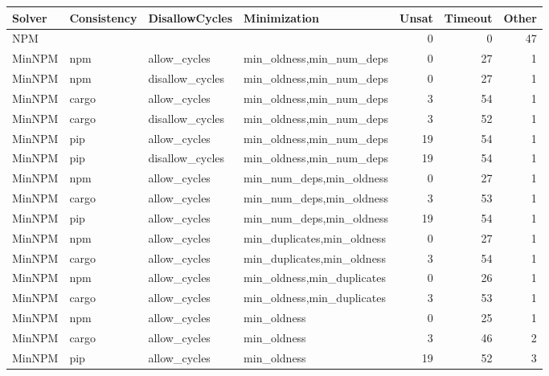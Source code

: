 \begin{table}[ht]
\centering
\begin{tabular}{llllrrr}
  \hline
Solver & Consistency & DisallowCycles & Minimization & Unsat & Timeout & Other \\ 
  \hline
NPM &  &  &  &   0 &   0 &  47 \\ 
  MinNPM & npm & allow\_cycles & min\_oldness,min\_num\_deps &   0 &  27 &   1 \\ 
  MinNPM & npm & disallow\_cycles & min\_oldness,min\_num\_deps &   0 &  27 &   1 \\ 
  MinNPM & cargo & allow\_cycles & min\_oldness,min\_num\_deps &   3 &  54 &   1 \\ 
  MinNPM & cargo & disallow\_cycles & min\_oldness,min\_num\_deps &   3 &  52 &   1 \\ 
  MinNPM & pip & allow\_cycles & min\_oldness,min\_num\_deps &  19 &  54 &   1 \\ 
  MinNPM & pip & disallow\_cycles & min\_oldness,min\_num\_deps &  19 &  54 &   1 \\ 
  MinNPM & npm & allow\_cycles & min\_num\_deps,min\_oldness &   0 &  27 &   1 \\ 
  MinNPM & cargo & allow\_cycles & min\_num\_deps,min\_oldness &   3 &  53 &   1 \\ 
  MinNPM & pip & allow\_cycles & min\_num\_deps,min\_oldness &  19 &  54 &   1 \\ 
  MinNPM & npm & allow\_cycles & min\_duplicates,min\_oldness &   0 &  27 &   1 \\ 
  MinNPM & cargo & allow\_cycles & min\_duplicates,min\_oldness &   3 &  54 &   1 \\ 
  MinNPM & npm & allow\_cycles & min\_oldness,min\_duplicates &   0 &  26 &   1 \\ 
  MinNPM & cargo & allow\_cycles & min\_oldness,min\_duplicates &   3 &  53 &   1 \\ 
  MinNPM & npm & allow\_cycles & min\_oldness &   0 &  25 &   1 \\ 
  MinNPM & cargo & allow\_cycles & min\_oldness &   3 &  46 &   2 \\ 
  MinNPM & pip & allow\_cycles & min\_oldness &  19 &  52 &   3 \\ 
   \hline
\end{tabular}
\end{table}
